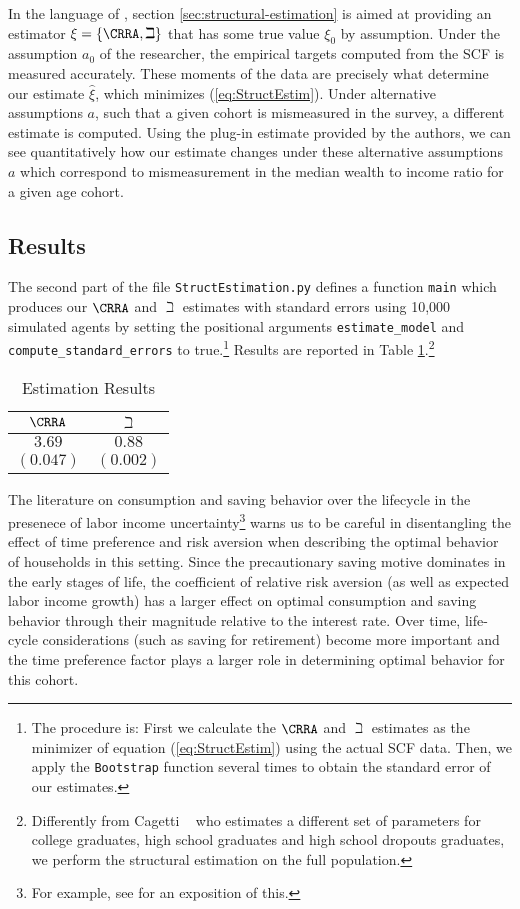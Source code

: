 \documentclass[titlepage, headings=optiontotocandhead]{Resources/texmf-local/tex/latex/econtex}
\begin{document}
In the language of \cite{andrews2017measuring}, section \ref{sec:structural-estimation} is aimed at providing an estimator $\xi =\{\CRRA ,{\beth}\}$ that has some true value $\xi_0 $ by assumption. Under the assumption $a_0$ of the researcher, the empirical targets computed from the SCF is measured accurately. These moments of the data are precisely what determine our estimate $\hat{\xi}$, which minimizes (\ref{eq:StructEstim}). Under alternative assumptions $a$, such that a given cohort is mismeasured in the survey, a different estimate is computed. Using the plug-in estimate provided by the authors, we can see quantitatively how our estimate changes under these alternative assumptions $a$ which correspond to mismeasurement in the median wealth to income ratio for a given age cohort.

\subsection{Results}
The second part of the file \texttt{StructEstimation.py}
defines a function \texttt{main} which produces our $\CRRA$ and
${\beth}$ estimates with standard errors using 10,000 simulated
agents by setting the positional arguments \texttt{estimate\_model} and
\texttt{compute\_standard\_errors} to true.\footnote{The procedure is: First we calculate the $\CRRA$ and
  ${\beth}$ estimates as the minimizer of equation
  (\ref{eq:StructEstim}) using the actual SCF data. Then, we apply the
  \texttt{Bootstrap} function several times to obtain the standard
  error of our estimates.} Results are reported in Table
\ref{tab:EstResults}.\footnote{Differently from Cagetti
  ~\citeyearpar{cagettiWprofiles} who estimates a different set of
  parameters for college graduates, high school graduates and high
  school dropouts graduates, we perform the structural estimation on
  the full population.}


  \begin{table}[h]
    \caption{Estimation Results}\label{tab:EstResults}
    \center
    \begin{tabular}{cc}
      \hline
      $\CRRA $ & ${\beth}$\\
      \hline
      $3.69$ & $0.88$\\
      $(0.047)$ & $(0.002)$\\
      \hline
    \end{tabular}
  \end{table}

The literature on consumption and saving behavior over the lifecycle in the presenece of labor income uncertainty\footnote{For example, see \cite{gpLifecycle} for an exposition of this.} warns us to be careful in disentangling the effect of time preference and risk aversion when describing the optimal behavior of households in this setting.  Since the precautionary saving motive dominates in the early stages of life, the coefficient of relative risk aversion (as well as expected labor income growth) has a larger effect on optimal consumption and saving behavior through their magnitude relative to the interest rate. Over time, life-cycle considerations (such as saving for retirement) become more important and the time preference factor plays a larger role in determining optimal behavior for this cohort.
\end{document}
